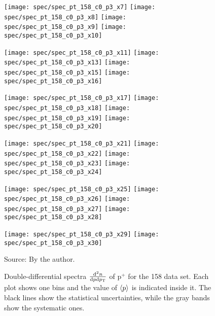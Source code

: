 \begin{figure}[!ht]
  \centering

  \texttt{[image: spec/spec\_pt\_158\_c0\_p3\_x7]}
  \texttt{[image: spec/spec\_pt\_158\_c0\_p3\_x8]}
  \texttt{[image: spec/spec\_pt\_158\_c0\_p3\_x9]}
  \texttt{[image: spec/spec\_pt\_158\_c0\_p3\_x10]}

  \texttt{[image: spec/spec\_pt\_158\_c0\_p3\_x11]}
  \texttt{[image: spec/spec\_pt\_158\_c0\_p3\_x13]}
  \texttt{[image: spec/spec\_pt\_158\_c0\_p3\_x15]}
  \texttt{[image: spec/spec\_pt\_158\_c0\_p3\_x16]}

  \texttt{[image: spec/spec\_pt\_158\_c0\_p3\_x17]}
  \texttt{[image: spec/spec\_pt\_158\_c0\_p3\_x18]}
  \texttt{[image: spec/spec\_pt\_158\_c0\_p3\_x19]}
  \texttt{[image: spec/spec\_pt\_158\_c0\_p3\_x20]}

  \texttt{[image: spec/spec\_pt\_158\_c0\_p3\_x21]}
  \texttt{[image: spec/spec\_pt\_158\_c0\_p3\_x22]}
  \texttt{[image: spec/spec\_pt\_158\_c0\_p3\_x23]}
  \texttt{[image: spec/spec\_pt\_158\_c0\_p3\_x24]}

  \texttt{[image: spec/spec\_pt\_158\_c0\_p3\_x25]}
  \texttt{[image: spec/spec\_pt\_158\_c0\_p3\_x26]}
  \texttt{[image: spec/spec\_pt\_158\_c0\_p3\_x27]}
  \texttt{[image: spec/spec\_pt\_158\_c0\_p3\_x28]}

  \texttt{[image: spec/spec\_pt\_158\_c0\_p3\_x29]}
  \texttt{[image: spec/spec\_pt\_158\_c0\_p3\_x30]}

  \caption{Double-differential spectra $\frac{\text{d}^2n}{\text{d}p\text{d}p_\text{T}}$
    of p$^+$ for the 158 \GeVc data set. Each plot shows one \pp bins and the value
    of $\langle p\rangle$ is indicated inside it. The black lines show the statistical
    uncertainties, while the gray bands show the systematic ones.}
  \label{fig:hadron:spec:dedx:all158:c0p3}
  \begin{center}
    \small Source: By the author. 
  \end{center}
\end{figure}

